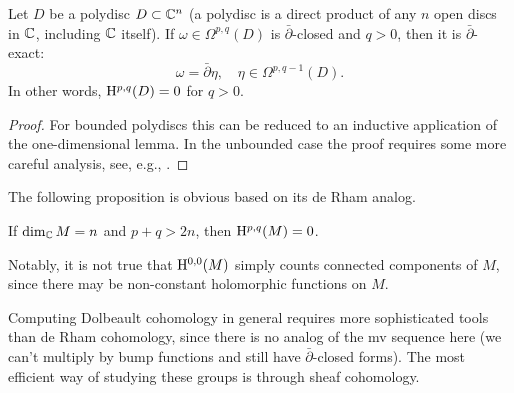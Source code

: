 \begin{thm} Let $D$ be a polydisc $D\subset \mathbb{C}^n$ (a polydisc is a direct product of any $n$ open discs in $\mathbb{C}$, including $\mathbb{C}$ itself). If $\omega\in\Omega^{p,q}(D)$ is $\bar\partial$-closed and $q>0$, then it is $\bar\partial$-exact:
    \[\omega=\bar\partial\eta,\quad \eta\in\Omega^{p,q-1}(D).\]
    In other words, $\mathrm{H}^{p,q}(D)=0$ for $q>0$.
\end{thm}
\begin{proof}
    For bounded polydiscs this can be reduced to an inductive application of the one-dimensional lemma. In the unbounded case the proof requires some more careful analysis, see, e.g., \cite[Prop.\ 1.3.8 and Cor.\ 1.3.9]{Huybrechts}.
\end{proof}

The following proposition is obvious based on its de Rham analog.

\begin{prop}
    If $\dim_{\mathbb{C}} M=n$ and $p+q>2n$, then $\mathrm{H}^{p,q}(M)=0$.
\end{prop}

Notably, it is not true that $\mathrm{H}^{0,0}(M)$ simply counts connected components of $M$, since there may be non-constant holomorphic functions on $M$.

Computing Dolbeault cohomology in general requires more sophisticated tools than de Rham cohomology, since there is no analog of the \gls{mv} sequence here (we can't multiply by bump functions and still have $\bar\partial$-closed forms). The most efficient way of studying these groups is through sheaf cohomology.


